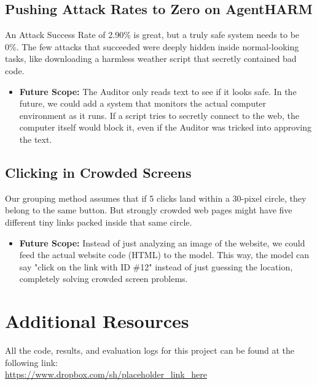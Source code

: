 \documentclass[11pt]{article}
\begin{document}
\subsection{Pushing Attack Rates to Zero on AgentHARM}
An Attack Success Rate of 2.90\% is great, but a truly safe system needs to be 0\%. The few attacks that succeeded were deeply hidden inside normal-looking tasks, like downloading a harmless weather script that secretly contained bad code.
\begin{itemize}
    \item \textbf{Future Scope:} The Auditor only reads text to see if it looks safe. In the future, we could add a system that monitors the actual computer environment as it runs. If a script tries to secretly connect to the web, the computer itself would block it, even if the Auditor was tricked into approving the text.
\end{itemize}

\subsection{Clicking in Crowded Screens}
Our grouping method assumes that if 5 clicks land within a 30-pixel circle, they belong to the same button. But strongly crowded web pages might have five different tiny links packed inside that same circle.
\begin{itemize}
    \item \textbf{Future Scope:} Instead of just analyzing an image of the website, we could feed the actual website code (HTML) to the model. This way, the model can say "click on the link with ID \#12" instead of just guessing the location, completely solving crowded screen problems.
\end{itemize}

\section{Additional Resources}
All the code, results, and evaluation logs for this project can be found at the following link: \\
\url{https://www.dropbox.com/sh/placeholder_link_here}
\end{document}
